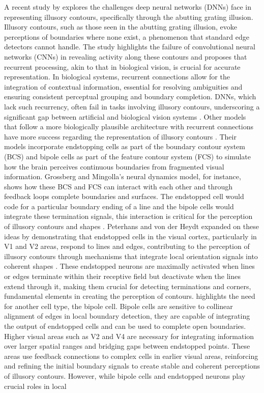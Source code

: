 \documentclass[12pt]{article}
\begin{document}
A recent study by \textcite{fanChallengingDeepLearning2023} explores the challenges deep neural networks (DNNs) face in representing illusory contours, specifically through the abutting grating illusion. Illusory contours, such as those seen in the abutting grating illusion, evoke perceptions of boundaries where none exist, a phenomenon that standard edge detectors cannot handle. The study highlights the failure of convolutional neural networks (CNNs) in revealing activity along these contours and proposes that recurrent processing, akin to that in biological vision, is crucial for accurate representation. In biological systems, recurrent connections allow for the integration of contextual information, essential for resolving ambiguities and ensuring consistent perceptual grouping and boundary completion. DNNs, which lack such recurrency, often fail in tasks involving illusory contours, underscoring a significant gap between artificial and biological vision systems \autocite{fanChallengingDeepLearning2023}. Other models that follow a more biologically plausible architecture with recurrent connections have more success regarding the representation of illusory contours \autocite{grossbergFillingInFormsSurface2003,vonderheydtMechanismsContourPerception1989}. Their models incorporate endstopping cells as part of the boundary contour system (BCS) and bipole cells as part of the feature contour system (FCS) to simulate how the brain perceives continuous boundaries from fragmented visual information. Grossberg and Mingolla's neural dynamics model, for instance, shows how these BCS and FCS can interact with each other and through feedback loops complete boundaries and surfaces. The endstopped cell would code for a particular boundary ending of a line and the bipole cells would integrate these termination signals, this interaction is critical for the perception of illusory contours and shapes \autocite{grossbergTextureSegregationSurface1998}. Peterhans and von der Heydt expanded on these ideas by demonstrating that endstopped cells in the visual cortex, particularly in V1 and V2 areas, respond to lines and edges, contributing to the perception of illusory contours through mechanisms that integrate local orientation signals into coherent shapes \autocite{grossbergTextureSegregationSurface1998}. These endstopped neurons are maximally activated when lines or edges terminate within their receptive field but deactivate when the lines extend through it, making them crucial for detecting terminations and corners, fundamental elements in creating the perception of contours. \textcite{grossbergFillingInFormsSurface2003} highlights the need for another cell type, the bipole cell. Bipole cells are sensitive to collinear alignment of edges in local boundary detection, they are capable of integrating the output of endstopped cells and can be used to complete open boundaries. Higher visual areas such as V2 and V4 are necessary for integrating information over larger spatial ranges and bridging gaps between endstopped points. These areas use feedback connections to complex cells in earlier visual areas, reinforcing and refining the initial boundary signals to create stable and coherent perceptions of illusory contours. However, while bipole cells and endstopped neurons play crucial roles in local 
\end{document}
